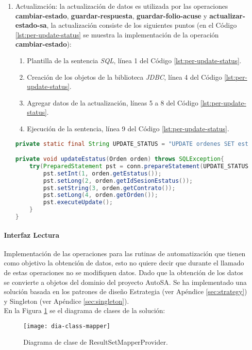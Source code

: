 \begin{enumerate}
	\item Actualización: la actualización de datos es utilizada por las operaciones \textbf{cambiar-estado}, \textbf{guardar-respuesta}, \textbf{guardar-folio-acuse} y \textbf{actualizar-estado-sa}, la actualización consiste de los siguientes puntos (en el Código \ref{lst:per-update-status} se muestra la implementación de la operación \textbf{cambiar-estado}):
	\begin{enumerate}
		\item Plantilla de la sentencia \textit{SQL}, línea 1 del Código \ref{lst:per-update-status}.
		\item Creación de los objetos de la biblioteca \textit{JDBC}, línea 4 del Código \ref{lst:per-update-status}.
		\item Agregar datos de la actualización, líneas 5 a 8 del Código \ref{lst:per-update-status}.
		\item Ejecución de la sentencia, línea 9 del Código \ref{lst:per-update-status}.
	\end{enumerate}

	\begin{lstlisting}[language=Java, caption={Actualización del estado de una orden de reposición.}, captionpos=b, label={lst:per-update-status}]
private static final String UPDATE_STATUS = "UPDATE ordenes SET estatus = ?, fecha_estatus = CURRENT_TIMESTAMP, id_sesion_estatus = ? WHERE contrato = ? AND orden = ?";

private void updateEstatus(Orden orden) throws SQLException{
	try(PreparedStatement pst = conn.prepareStatement(UPDATE_STATUS)){
		pst.setInt(1, orden.getEstatus());
		pst.setLong(2, orden.getIdSesionEstatus());
		pst.setString(3, orden.getContrato());
		pst.setLong(4, orden.getOrden());
		pst.executeUpdate();
	}
}
	\end{lstlisting}
\end{enumerate}

\paragraph{\indent Interfaz Lectura\\}
Implementación de las operaciones para las rutinas de automatización que tienen como objetivo la obtención de datos, esto no quiere decir que durante el llamado de estas operaciones no se modifiquen datos.
Dado que la obtención de los datos se convierte a objetos del dominio del proyecto AutoSA. Se ha implementado una solución basada en los patrones de diseño Estrategia (ver Apéndice \ref{sec:strategy}) y Singleton (ver Apéndice \ref{sec:singleton}). \\
En la Figura \ref{fig:dia-class-mapper} se el diagrama de clases de la solución:
\begin{figure}[h]
	\centering
	\texttt{[image: dia-class-mapper]}
	\caption{Diagrama de clase de ResultSetMapperProvider.}
	\label{fig:dia-class-mapper}
\end{figure}

